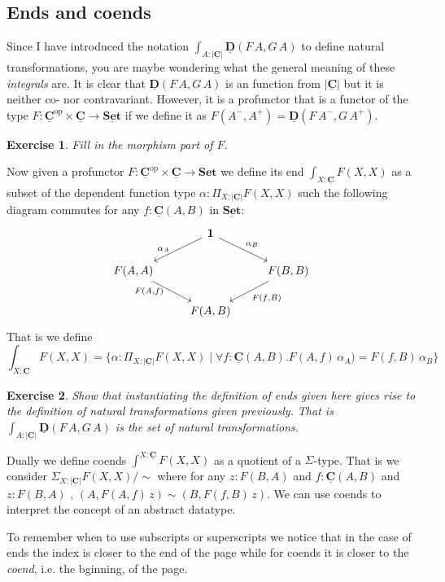 \documentclass{article}
\newcommand{\Set}{\mathbf{Set}}
\newcommand{\cat}[1]{\underline{\mathbf{#1}}}
\newcommand{\obj}[1]{|#1|}
\newcommand{\homC}[3]{\cat{#1}(#2,#3)}
\newcommand{\op}{\mathrm{op}}
\newtheorem{exercise}{Exercise}
\begin{document}
\subsection{Ends and coends}
\label{sec:ends-coends}

Since I have introduced the notation $\int_{A : \obj{\cat{C}}} \cat{D}(F\,A,G\,A)$ to define natural transformations, you are maybe wondering what the general meaning of these \emph{integrals} are. It is clear that $\cat{D}(F\,A,G\,A)$ is an function from
$\obj{\cat{C}}$ but it is neither co- nor contravariant. However, it is a profunctor that is a functor of the type $F : \cat{C}^\op\times\cat{C} \to \cat{\Set}$ if we define it as $F(A^{-},A^{+})= \cat{D}(F\,A^{-},G\,A^{+})$.
\begin{exercise}
  Fill in the morphism part of $F$.
\end{exercise}
Now given a profunctor $F : \cat{C}^\op\times\cat{C} \to \Set$ we define its end $\int_{X: \cat{C}}F(X,X)$ as a subset of the dependent function type $\alpha:\Pi_{X : \obj{\cat{C}}}F(X,X)$ such the following diagram commutes for any $f : \homC{C}{A}{B}$ in $\cat{Set}$:
\[\begin{tikzcd}
  & \bf{1} \arrow[dl,"\alpha_A" left=5]\arrow[dr,"\alpha_B"]\\
  F(A,A) \arrow[dr, "F(A {,} f)" left= 5] & & F(B,B) \arrow[dl,"F(f {,} B)"]\\  
  & F(A,B) 
\end{tikzcd}
\]
That is we define
\[ \int_{X:\cat{C}} F(X,X) = \{ \alpha : \Pi_{X : \obj{\cat{C}}}F(X,X) \mid
  \forall {f : \homC{C}{A}{B}} . F(A,f)\,\alpha_A) = F(f,B)\,\alpha_B \}\]
\begin{exercise}
  Show that instantiating the definition of ends given here gives rise to the definition of natural transformations given previously.
  That is $\int_{A : \obj{\cat{C}}} \cat{D}(F\,A,G\,A)$ is the set of natural transformations.
\end{exercise}

Dually we define coends $\int^{X:\cat{C}} F(X,X)$ as a quotient of a $\Sigma$-type. That is we consider
$\Sigma_{X : \obj{\cat{C}}}F(X,X) / \sim$ where for any  $z : F(B,A)$ and $f: \homC{C}{A}{B}$ and $z : F(B,A)$ ,
$(A,F(A,f)\,z) \sim (B,F(f,B)\,z)$. We can use coends to interpret the concept of an abstract datatype.


To remember when to use subscripts or superscripts we notice that in the case of ends the index is closer to the end of the page while for coends it is closer to the \emph{coend}, i.e. the bginning, of the page.
\end{document}
